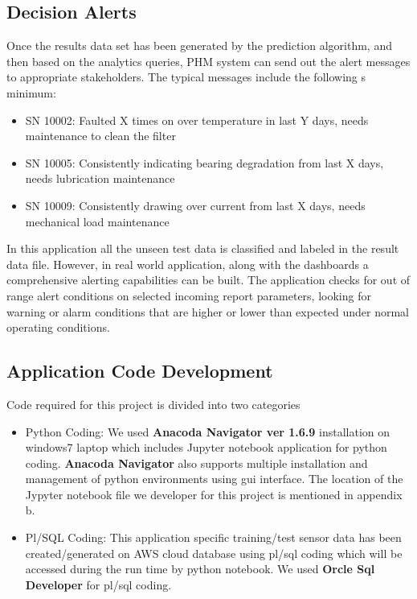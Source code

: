 \documentclass[sigconf]{acmart}
\begin{document}
\subsection{Decision Alerts}
Once the results data set has been generated by the prediction algorithm, and then based on the analytics queries, PHM system can send out the alert messages to appropriate stakeholders. The typical messages include the following s minimum:
\begin{itemize}
  \item SN 10002: Faulted X times on over temperature in last Y days, needs maintenance to clean the filter
  \item SN 10005: Consistently indicating bearing degradation from last X days, needs lubrication maintenance
\item SN 10009: Consistently drawing over current from last X days, needs mechanical load maintenance
\end{itemize}

In this application all the unseen test data is classified and labeled in the result data file. However, in real world application, along with the dashboards a comprehensive alerting capabilities can be built. The application checks for out of range alert conditions on selected incoming report parameters, looking for warning or alarm conditions that are higher or lower than expected under normal operating conditions.

\subsection{Application Code Development}
Code required for this project is divided into two categories
\begin{itemize}
    \item Python Coding:
          We used \textbf{Anacoda Navigator ver 1.6.9} \cite{Anaconda2017} installation on windows7 laptop which includes Jupyter notebook application for python coding. \textbf{Anacoda Navigator} also supports multiple installation and management of python environments using gui interface. The location of the Jypyter notebook file we developer for this project is mentioned in appendix b.
    \item Pl/SQL Coding:
          This application specific training/test sensor data has been created/generated on AWS cloud database using pl/sql coding which will be accessed during the run time by python notebook. We used \textbf{Orcle Sql Developer } \cite{SQLDeveloper2017} for pl/sql coding.
\end{itemize}
\end{document}
